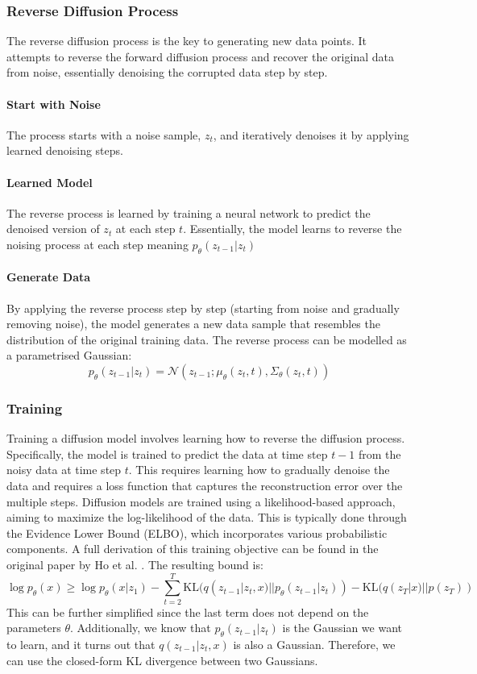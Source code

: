 \subsubsection{Reverse Diffusion Process}
The reverse diffusion process is the key to generating new data points. It attempts to reverse the forward diffusion process 
and recover the original data from noise, essentially denoising the corrupted data step by step.
\paragraph{Start with Noise} The process starts with a noise sample, $z_t$, and iteratively denoises it by applying learned 
denoising steps.
\paragraph{Learned Model} The reverse process is learned by training a neural network to predict the denoised version 
of $z_t$ at each step $t$. Essentially, the model learns to reverse the noising process at each step meaning 
$p_\theta(z_{t-1}|z_t)$
\paragraph{Generate Data} By applying the reverse process step by step (starting from noise and gradually removing noise),
the model generates a new data sample that resembles the distribution of the original training data. The reverse process can 
be modelled as a parametrised Gaussian: 
$$p_\theta(z_{t-1}|z_t )= \mathcal{N}(z_{t-1};\mu_\theta(z_t,t),\Sigma_\theta(z_t,t))$$

\subsubsection{Training}
Training a diffusion model involves learning how to reverse the diffusion process. 
Specifically, the model is trained to predict the data at time step $t-1$ from the noisy 
data at time step $t$. This requires learning how to gradually denoise the data and 
requires a loss function that captures the reconstruction error over the multiple steps.
Diffusion models are trained using a likelihood-based approach, aiming to maximize the 
log-likelihood of the data. This is typically done through the Evidence Lower Bound (ELBO),
which incorporates various probabilistic components. A full derivation of this training objective
can be found in the original paper by Ho et al. \cite{ho2020denoisingdiffusionprobabilisticmodels}. 
The resulting bound is:
$$\log{p_\theta(x)} \geq \log{p_\theta(x|z_1)} - \overset{T}{\underset{t=2}{\sum}} \text{KL}(q(z_{t-1}|z_t,x)||p_\theta(z_{t-1}|z_t))-\text{KL}(q(z_T|x)||p(z_T))$$
This can be further simplified since the last term does not depend on the parameters 
$\theta$. Additionally, we know that $p_\theta(z_{t-1}|z_t)$  is the Gaussian we want to 
learn, and it turns out that  $q(z_{t-1}|z_t,x)$ is also a Gaussian. 
Therefore, we can use the closed-form KL divergence between two Gaussians. 

